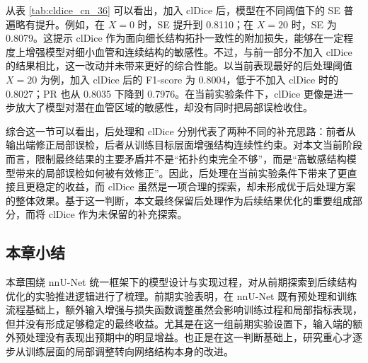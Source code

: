 \documentclass[a4paper,12pt]{article}
\begin{document}
\begin{table}[htbp]
\centering
\caption{加入 clDice 后在不同后处理阈值下的结果对比}
\label{tab:cldice_cn_36}
\end{table}

从表 \ref{tab:cldice_cn_36} 可以看出，加入 clDice 后，模型在不同阈值下的 SE 普遍略有提升。例如，在 \(X=0\) 时，SE 提升到 0.8110；在 \(X=20\) 时，SE 为 0.8079。这提示 clDice 作为面向细长结构拓扑一致性的附加损失，能够在一定程度上增强模型对细小血管和连续结构的敏感性。不过，与前一部分不加入 clDice 的结果相比，这一改动并未带来更好的综合性能。以当前表现最好的后处理阈值 \(X=20\) 为例，加入 clDice 后的 F1-score 为 0.8004，低于不加入 clDice 时的 0.8027；PR 也从 0.8035 下降到 0.7976。在当前实验条件下，clDice 更像是进一步放大了模型对潜在血管区域的敏感性，却没有同时把局部误检收住。

综合这一节可以看出，后处理和 clDice 分别代表了两种不同的补充思路：前者从输出端修正局部误检，后者从训练目标层面增强结构连续性约束。对本文当前阶段而言，限制最终结果的主要矛盾并不是“拓扑约束完全不够”，而是“高敏感结构模型带来的局部误检如何被有效修正”。因此，后处理在当前实验条件下带来了更直接且更稳定的收益，而 clDice 虽然是一项合理的探索，却未形成优于后处理方案的整体效果。基于这一判断，本文最终保留后处理作为后续结果优化的重要组成部分，而将 clDice 作为未保留的补充探索。

\subsection{本章小结}
本章围绕 nnU-Net 统一框架下的模型设计与实现过程，对从前期探索到后续结构优化的实验推进逻辑进行了梳理。前期实验表明，在 nnU-Net 既有预处理和训练流程基础上，额外输入增强与损失函数调整虽然会影响训练过程和局部指标表现，但并没有形成足够稳定的最终收益。尤其是在这一组前期实验设置下，输入端的额外预处理没有表现出预期中的明显增益。也正是在这一判断基础上，研究重心才逐步从训练层面的局部调整转向网络结构本身的改进。
\end{document}
